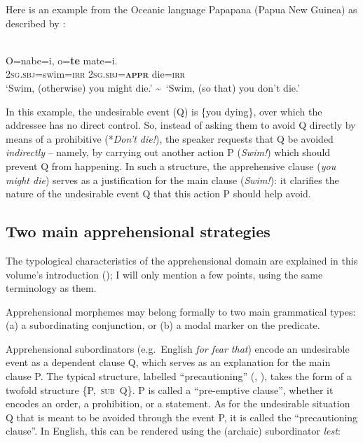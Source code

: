 \documentclass[output=paper,colorlinks,citecolor=brown]{langscibook}
\begin{document}
Here is an example from the Oceanic language Papapana (Papua New Guinea) as described by \citet{smithdennis2021}:


 
\ea {} \\
\label{ex:Fra1}
\gll O=nabe=i, o=\textbf{te} mate=i. \\
\textsc{2sg.sbj}=swim=\textsc{irr} \textsc{2sg.sbj=\textbf{appr}} die=\textsc{irr} \\
\glt `Swim, (otherwise) you might die.' \textasciitilde~`Swim, (so that) you don't die.' 
\z
 
\noindent In this example, the undesirable event (Q) is \{you dying\}, over which the addressee has no direct control. So, instead of asking them to avoid Q directly by means of a prohibitive (*\textit{Don't die!}), the speaker requests that Q be avoided \textit{indirectly} -- namely, by carrying out another action P (\textit{Swim!}) which should prevent Q from happening. In such a structure, the apprehensive clause (\textit{you might die}) serves as a justification for the main clause (\textit{Swim!}): it clarifies the nature of the undesirable event Q that this action P should help avoid.
 

\subsection{Two main apprehensional strategies}
\label{subsec:twomain}

 
The typological characteristics of the apprehensional domain are explained in this volume's introduction (\citealt{chapters/introduction}); I will only mention a few points, using the same terminology as them. 

Apprehensional morphemes may belong formally to two main grammatical types: (a) a subordinating conjunction, or (b) a modal marker on the predicate.



Apprehensional subordinators (e.g.\ English \textit{for fear that}) encode an undesirable event as a dependent clause Q, which serves as an explanation for the main clause P. The typical structure, labelled ``precautioning'' (\citealt[260]{vuillermet2018a}, \citealt{chapters/introduction}), takes the form of a twofold structure {\{P,~\textsc{sub}~Q\}}. P is called a ``pre-emptive clause'', whether it encodes an order, a prohibition, or a statement. As for the undesirable situation Q that is meant to be avoided through the event P, it is called the ``precautioning clause''. In English, this can be rendered using the (archaic) subordinator \textit{lest}:
\end{document}

